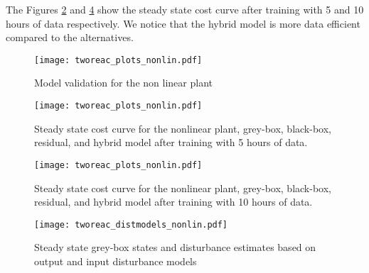 \documentclass{article}
\begin{document}
The Figures \ref{fig:cost_nonlinear_5hours} and \ref{fig:cost_nonlinear_10hours}
show the steady state cost curve after training with 5 and 10 hours 
of data respectively. We notice that the hybrid model is more data efficient 
compared to the alternatives.

\begin{figure}[!h]
  \centering
  \texttt{[image: tworeac\_plots\_nonlin.pdf]}
  \caption{Model validation for the non linear plant}
  \label{fig:validation_nonlinear}
\end{figure}



\begin{figure}[!h]
  \centering
  \texttt{[image: tworeac\_plots\_nonlin.pdf]}
  \caption{Steady state cost curve for the nonlinear plant, grey-box, 
  black-box, residual, and hybrid model after training with 5 hours of data.}
  \label{fig:cost_nonlinear_5hours}
\end{figure}

\begin{figure}[!h]
  \centering
  \texttt{[image: tworeac\_plots\_nonlin.pdf]}
  \caption{Steady state cost curve for the nonlinear plant, grey-box, 
  black-box, residual, and hybrid model after training with 10 hours of data.}
  \label{fig:cost_nonlinear_10hours}
\end{figure}

\begin{figure}[!h]
  \centering
  \texttt{[image: tworeac\_distmodels\_nonlin.pdf]}
  \caption{Steady state grey-box states and disturbance estimates based on 
  output and input disturbance models}
  \label{fig:cost_nonlinear_10hours}
\end{figure}
\end{document}
